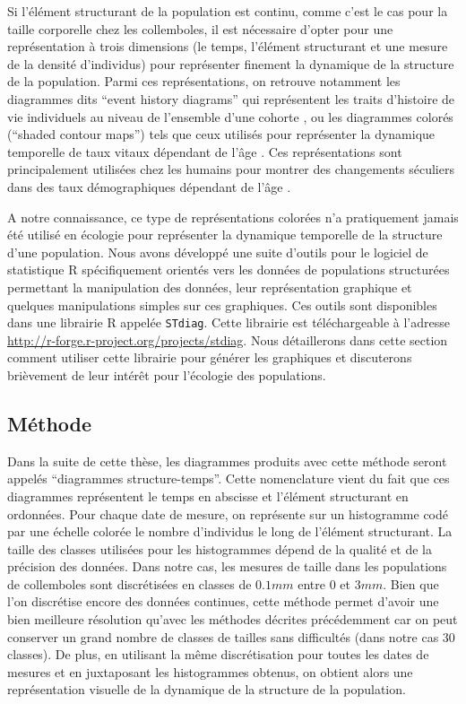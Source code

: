 Si l'élément structurant de la population est continu, comme c'est le cas
pour la taille corporelle chez les collemboles, il est nécessaire d'opter pour
une représentation à trois dimensions (le temps, l'élément structurant et une
mesure de la densité d'individus) pour représenter finement la dynamique de la
structure de la population. Parmi ces représentations, on retrouve notamment les
diagrammes dits ``event history diagrams'' qui représentent les traits
d'histoire de vie individuels au niveau de l'ensemble d'une cohorte
\autocites{carey1998a,carey2008a}, ou les diagrammes colorés (``shaded contour
maps'') tels que ceux utilisés pour représenter la dynamique temporelle de taux
vitaux dépendant de l'âge \autocites[mortalité ou natalité chez les humains par
exemple,][]{vaupel1997a,vaupel1998a}. Ces représentations sont
principalement utilisées chez les humains pour montrer des changements séculiers
dans des taux démographiques dépendant de l'âge
\autocite{vaupel1987a,vaupel1997a,vaupel1998a,andreev2000a,erlangsen2003a}.

A notre connaissance, ce type de représentations colorées n'a pratiquement
jamais été utilisé en écologie pour représenter la dynamique temporelle de la
structure d'une population. Nous avons développé une suite d'outils pour le
logiciel de statistique R \autocites{team2012a} spécifiquement
orientés vers les données de populations structurées permettant la manipulation
des données, leur représentation graphique et quelques manipulations simples sur
ces graphiques. Ces outils sont disponibles dans une librairie R appelée
\texttt{STdiag}. Cette librairie est téléchargeable à l'adresse
\url{http://r-forge.r-project.org/projects/stdiag}.
Nous détaillerons dans cette section comment utiliser cette librairie pour
générer les graphiques et discuterons brièvement de leur intérêt pour l'écologie
des populations. 

\subsection{Méthode}

Dans la suite de cette thèse, les diagrammes produits avec cette méthode seront
appelés ``diagrammes structure-temps''. Cette nomenclature vient du fait que ces
diagrammes représentent le temps en abscisse et l'élément structurant en
ordonnées. Pour chaque date de mesure, on représente sur un histogramme codé par
une échelle colorée le nombre d'individus le long de l'élément structurant. La
taille des classes utilisées pour les histogrammes dépend de la qualité et de la
précision des données. Dans notre cas, les mesures de taille dans les
populations de collemboles sont discrétisées en classes de $0.1mm$ entre $0$
et $3mm$. Bien que l'on discrétise encore des données continues, cette méthode
permet d'avoir une bien meilleure résolution qu'avec les méthodes décrites
précédemment car on peut conserver un grand nombre de classes de tailles sans
difficultés (dans notre cas 30 classes). De plus, en utilisant la même
discrétisation pour toutes les dates de mesures et en juxtaposant les
histogrammes obtenus, on obtient alors une représentation visuelle de la
dynamique de la structure de la population. 

